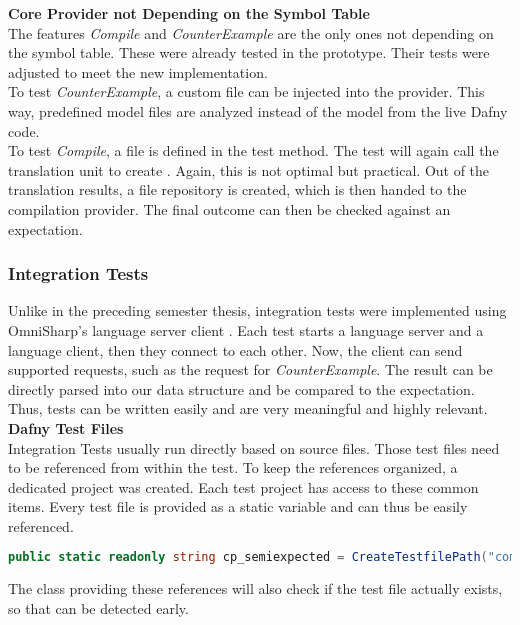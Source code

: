 \textbf{Core Provider not Depending on the Symbol Table}\\
The features \textit{Compile} and \textit{CounterExample} are the only ones not depending on the symbol table.
These were already tested in the prototype.
Their tests were adjusted to meet the new implementation.\\

To test \textit{CounterExample}, a custom  file can be injected into the provider.
This way, predefined model files are analyzed instead of the model from the live Dafny code.\\

To test \textit{Compile}, a  file is defined in the test method.
The test will again call the translation unit to create .
Again, this is not optimal but practical.
Out of the translation results, a file repository is created, which is then handed to the compilation provider.
The final outcome can then be checked against an expectation.



\subsubsection{Integration Tests}

Unlike in the preceding semester thesis, integration tests were implemented using OmniSharp's language server client \cite{omnisharpClient}.
Each test starts a language server and a language client, then they connect to each other.
Now, the client can send supported requests, such as the request for \textit{CounterExample}.
The result can be directly parsed into our  data structure and be compared to the expectation.
Thus, tests can be written easily and are very meaningful and highly relevant.\\

\textbf{Dafny Test Files}\\
Integration Tests usually run directly based on  source files.
Those test files need to be referenced from within the test.
To keep the references organized, a dedicated project  was created.
Each test project has access to these common items.
Every test file is provided as a static variable and can thus be easily referenced.

\begin{lstlisting}[language=csharp, caption={Test File Reference}, captionpos=b, label={lst:semiExpectedCodeThing}]
public static readonly string cp_semiexpected = CreateTestfilePath("compile/semi_expected_error.dfy");
\end{lstlisting}
The class providing these references will also check if the test file actually exists, so that \linebreak {} can be detected early.\\

